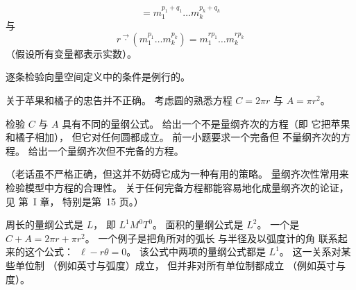 \begin{exercises}
\begin{equation*}
        =
        m_1^{p_1+q_1}\dots m_k^{p_k+q_k}
      \end{equation*}
      与
      \begin{equation*}
        r\vec{\cdot} (m_1^{p_1}\dots m_k^{p_k})
        =
        m_1^{rp_1}\dots m_k^{rp_k}
      \end{equation*}
      （假设所有变量都表示实数）。
      \begin{answer}
        逐条检验向量空间定义中的条件是例行的。
      \end{answer}
  \item \label{exer:AppsAndOranges}
    关于苹果和橘子的忠告并不正确。
    考虑圆的熟悉方程 $C=2\pi r$ 与 $A=\pi r^2$。
    \begin{exparts}
      \partsitem 检验 $C$ 与 $A$ 具有不同的量纲公式。
      \partsitem 给出一个不是量纲齐次的方程（即 
        它把苹果和橘子相加），
        但它对任何圆都成立。
      \partsitem 前一小题要求一个完备但
        不量纲齐次的方程。
        给出一个量纲齐次但不完备的方程。
    \end{exparts}
    （老话虽不严格正确，但这并不妨碍它成为一种有用的策略。
    量纲齐次性常用来检验模型中方程的合理性。
    关于任何完备方程都能容易地化成量纲齐次的论证，
    见 \cite{Bridgman} 第~I 章，
    特别是第~15 页。）
    \begin{answer}
      \begin{exparts}
        \partsitem 周长的量纲公式是 $L$，
          即 $L^1M^0T^0$。
          面积的量纲公式是 $L^2$。
        \partsitem 一个是 $C+A=2\pi r + \pi r^2$。
        \partsitem 一个例子是把角所对的弧长
           与半径及以弧度计的角
           联系起来的这个公式：~$\ell-r\theta=0$。
           该公式中两项的量纲公式都是
           $L^1$。
           这一关系对某些单位制
           （例如英寸与弧度）成立，
           但并非对所有单位制都成立
           （例如英寸与度）。  
      \end{exparts}
    \end{answer}
\end{exercises}
\endinput
